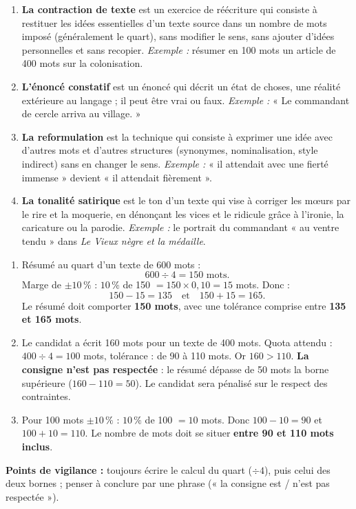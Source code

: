 \documentclass[11pt]{article}
\begin{document}
\begin{corrige}
\begin{enumerate}
\item \textbf{La contraction de texte} est un exercice de réécriture qui consiste à restituer les idées essentielles d'un texte source dans un nombre de mots imposé (généralement le quart), sans modifier le sens, sans ajouter d'idées personnelles et sans recopier. \textit{Exemple :} résumer en 100 mots un article de 400 mots sur la colonisation.
\item \textbf{L'énoncé constatif} est un énoncé qui décrit un état de choses, une réalité extérieure au langage ; il peut être vrai ou faux. \textit{Exemple :} « Le commandant de cercle arriva au village. »
\item \textbf{La reformulation} est la technique qui consiste à exprimer une idée avec d'autres mots et d'autres structures (synonymes, nominalisation, style indirect) sans en changer le sens. \textit{Exemple :} « il attendait avec une fierté immense » devient « il attendait fièrement ».
\item \textbf{La tonalité satirique} est le ton d'un texte qui vise à corriger les mœurs par le rire et la moquerie, en dénonçant les vices et le ridicule grâce à l'ironie, la caricature ou la parodie. \textit{Exemple :} le portrait du commandant « au ventre tendu » dans \emph{Le Vieux nègre et la médaille}.
\end{enumerate}
\end{corrige}

\begin{corrige}
\begin{enumerate}
\item Résumé au quart d'un texte de 600 mots :
\[ 600 \div 4 = 150 \text{ mots.} \]
Marge de $\pm 10\,\%$ : $10\,\%$ de 150 $= 150 \times 0,10 = 15$ mots. Donc :
\[ 150 - 15 = 135 \quad \text{et} \quad 150 + 15 = 165. \]
Le résumé doit comporter \textbf{150 mots}, avec une tolérance comprise entre \textbf{135 et 165 mots}.
\item Le candidat a écrit 160 mots pour un texte de 400 mots. Quota attendu : $400 \div 4 = 100$ mots, tolérance : de 90 à 110 mots. Or $160 > 110$. \textbf{La consigne n'est pas respectée} : le résumé dépasse de 50 mots la borne supérieure ($160 - 110 = 50$). Le candidat sera pénalisé sur le respect des contraintes.
\item Pour 100 mots $\pm 10\,\%$ : $10\,\%$ de 100 $= 10$ mots. Donc $100 - 10 = 90$ et $100 + 10 = 110$. Le nombre de mots doit se situer \textbf{entre 90 et 110 mots inclus}.
\end{enumerate}
\textbf{Points de vigilance :} toujours écrire le calcul du quart ($\div 4$), puis celui des deux bornes ; penser à conclure par une phrase (« la consigne est / n'est pas respectée »).
\end{corrige}
\end{document}
